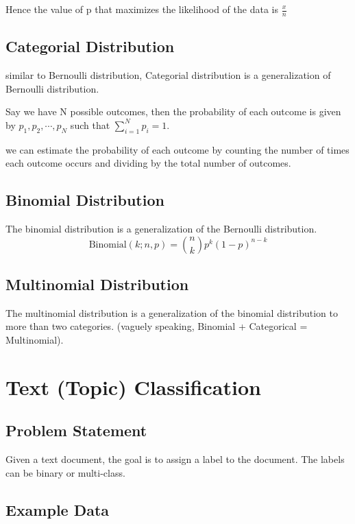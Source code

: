 Hence the value of p that maximizes the likelihood of the data is \( \frac{x}{n} \) 


\subsection{Categorial Distribution}
similar to Bernoulli distribution, Categorial distribution is a generalization of Bernoulli distribution.


\noindent Say we have N possible outcomes, then the probability of each outcome is given by $p_1, p_2, \cdots, p_N$ such that $\sum_{i=1}^{N} p_i = 1$.

we can estimate the probability of each outcome by counting the number of times each outcome occurs and dividing by the total number of outcomes.

\subsection{Binomial Distribution}
The binomial distribution is a generalization of the Bernoulli distribution.
\[
\text{Binomial}(k ; n, p) = \binom{n}{k} p^k (1 - p)^{n - k}
\]


\subsection{Multinomial Distribution}

The multinomial distribution is a generalization of the binomial distribution to more than two categories. (vaguely speaking, Binomial + Categorical = Multinomial). 


\section{Text (Topic) Classification}

\subsection{Problem Statement}
Given a text document, the goal is to assign a label to the document. The labels can be binary or multi-class.


\subsection{Example Data}

